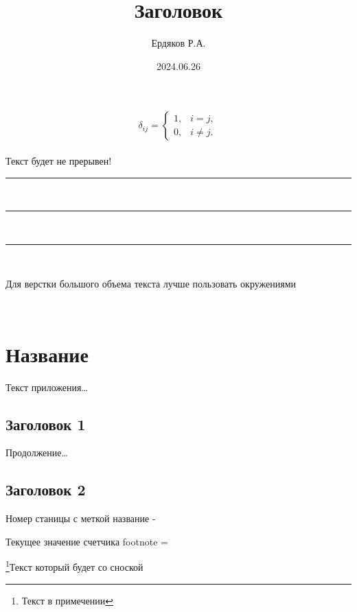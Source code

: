 \documentclass[a4paper, 10pt]{article}
\begin{document}
\title{Заголовок}
\author{Ердяков Р.А.}
\date{2024.06.26}
\maketitle
$$ \delta_{ij} =
\begin{cases}
  1, & i=j,\\
  0, & i\ne j.
\end{cases} $$
\\
Текст %
будет не %
прерывен! %
\\
\rule[10pt]{25pt}{1pt}
\\
\rule[-5pt]{10pt}{10pt}
\\
\rule{6pt}{6pt}
\\
\begin{itshape}
  Для верстки большого объема текста лучше пользовать окружениями
\end{itshape}
\\
\appendix
\section{Название}\label{section_name}
Текст приложения\dots
\subsection{Заголовок 1}\label{section_1}
Продолжение\dots
\subsection{Заголовок 2}\label{section_2}
\tableofcontents

Номер станицы с меткой название - \pageref{section_name}

\setcounter{footnote}{0}
\addtocounter{footnote}{2}
Текущее значение счетчика footnote = \thefootnote

\footnote{Текст в примечении}{Текст который будет со сноской}

\newpage
\end{document}
